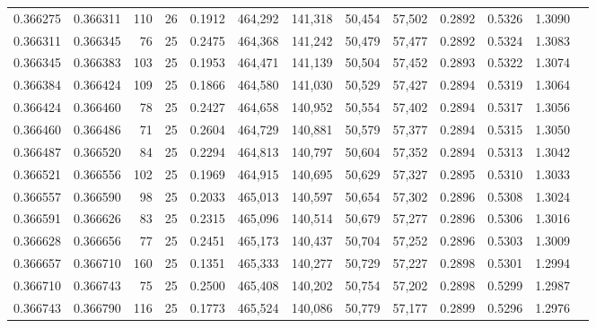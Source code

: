 \begin{tabular}{rrrrrrrrrrrrr}
0.366275 & 0.366311 &   110 &  26 &                                     0.1912 & 464,292 & 141,318 &  50,454 &  57,502 & 0.2892 & 0.5326 & 1.3090 \\
0.366311 & 0.366345 &    76 &  25 &                                     0.2475 & 464,368 & 141,242 &  50,479 &  57,477 & 0.2892 & 0.5324 & 1.3083 \\
0.366345 & 0.366383 &   103 &  25 &                                     0.1953 & 464,471 & 141,139 &  50,504 &  57,452 & 0.2893 & 0.5322 & 1.3074 \\
0.366384 & 0.366424 &   109 &  25 &                                     0.1866 & 464,580 & 141,030 &  50,529 &  57,427 & 0.2894 & 0.5319 & 1.3064 \\
0.366424 & 0.366460 &    78 &  25 &                                     0.2427 & 464,658 & 140,952 &  50,554 &  57,402 & 0.2894 & 0.5317 & 1.3056 \\
0.366460 & 0.366486 &    71 &  25 &                                     0.2604 & 464,729 & 140,881 &  50,579 &  57,377 & 0.2894 & 0.5315 & 1.3050 \\
0.366487 & 0.366520 &    84 &  25 &                                     0.2294 & 464,813 & 140,797 &  50,604 &  57,352 & 0.2894 & 0.5313 & 1.3042 \\
0.366521 & 0.366556 &   102 &  25 &                                     0.1969 & 464,915 & 140,695 &  50,629 &  57,327 & 0.2895 & 0.5310 & 1.3033 \\
0.366557 & 0.366590 &    98 &  25 &                                     0.2033 & 465,013 & 140,597 &  50,654 &  57,302 & 0.2896 & 0.5308 & 1.3024 \\
0.366591 & 0.366626 &    83 &  25 &                                     0.2315 & 465,096 & 140,514 &  50,679 &  57,277 & 0.2896 & 0.5306 & 1.3016 \\
0.366628 & 0.366656 &    77 &  25 &                                     0.2451 & 465,173 & 140,437 &  50,704 &  57,252 & 0.2896 & 0.5303 & 1.3009 \\
0.366657 & 0.366710 &   160 &  25 &                                     0.1351 & 465,333 & 140,277 &  50,729 &  57,227 & 0.2898 & 0.5301 & 1.2994 \\
0.366710 & 0.366743 &    75 &  25 &                                     0.2500 & 465,408 & 140,202 &  50,754 &  57,202 & 0.2898 & 0.5299 & 1.2987 \\
0.366743 & 0.366790 &   116 &  25 &                                     0.1773 & 465,524 & 140,086 &  50,779 &  57,177 & 0.2899 & 0.5296 & 1.2976 \\

\end{tabular}
